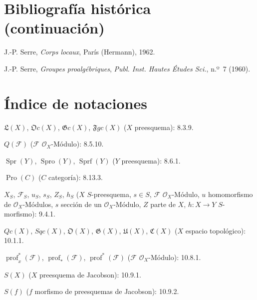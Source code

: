 \clearpage
{}
{}
\section*{Bibliografía histórica (continuación)}

\begin{description}[style=multiline,leftmargin=3.5em,labelwidth=2.8em]
  \item[{[39]}] J.-P. Serre, \emph{Corps locaux}, París (Hermann), 1962.
  \item[{[40]}] J.-P. Serre, \emph{Groupes proalgébriques},
  \emph{Publ. Inst. Hautes Études Sci.}, n.º~7 (1960).
\end{description}

\clearpage
{}
{}
\section*{Índice de notaciones}

\begingroup
\small
\setlength{\parindent}{0pt}
\setlength{\parskip}{2pt}

$\mathfrak{L}(X)$, $\mathfrak{O}c(X)$, $\mathfrak{G}c(X)$,
$\mathfrak{F}gc(X)$ ($X$ preesquema): 8.3.9.

$Q(\mathcal F)$ ($\mathcal F$ $\mathcal O_X$-Módulo): 8.5.10.

$\operatorname{Spr}(Y)$, $\operatorname{Spro}(Y)$,
$\operatorname{Sprf}(Y)$ ($Y$ preesquema): 8.6.1.

$\operatorname{Pro}(C)$ ($C$ categoría): 8.13.3.

$X_S$, $\mathcal F_S$, $u_S$, $s_S$, $Z_S$, $h_S$
($X$ $S$-preesquema, $s\in S$, $\mathcal F$ $\mathcal O_X$-Módulo,
$u$ homomorfismo de $\mathcal O_X$-Módulos, $s$ sección de un
$\mathcal O_X$-Módulo, $Z$ parte de $X$, $h:X\to Y$ $S$-morfismo): 9.4.1.

$Qc(X)$, $Sqc(X)$, $\mathfrak O(X)$, $\mathfrak G(X)$,
$\mathfrak U(X)$, $\mathfrak C(X)$ ($X$ espacio topológico): 10.1.1.

$\operatorname{prof}^{*}_{x}(\mathcal F)$,
$\operatorname{prof}_{*}(\mathcal F)$,
$\operatorname{prof}^{*}(\mathcal F)$
($\mathcal F$ $\mathcal O_X$-Módulo): 10.8.1.

$S(X)$ ($X$ preesquema de Jacobson): 10.9.1.

$S(f)$ ($f$ morfismo de preesquemas de Jacobson): 10.9.2.

